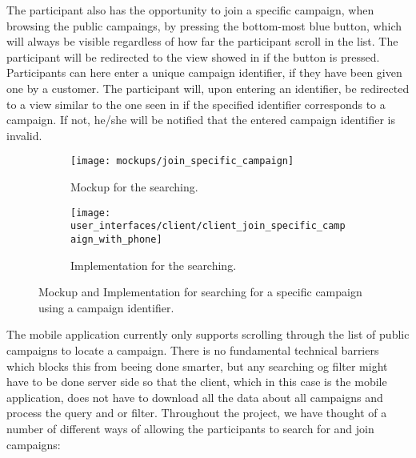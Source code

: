 The participant also has the opportunity to join a specific campaign, when browsing the public campaings, by pressing the bottom-most blue button, which will always be visible regardless of how far the participant scroll in the list. The participant will be redirected to the view showed in  if the button is pressed. Participants can here enter a unique campaign identifier, if they have been given one by a customer. The participant will, upon entering an identifier, be redirected to a view similar to the one seen in  if the specified identifier corresponds to a campaign. If not, he/she will be notified that the entered campaign identifier is invalid. 

\begin{figure}[!htbp]
    \begin{subfigure}[!t]{.48\textwidth}
        \centering
        \texttt{[image: mockups/join\_specific\_campaign]}
        \caption{Mockup for the searching.}
        \label{fig:mockup_specific_campaign}
    \end{subfigure}%
    \begin{subfigure}[!t]{.52\textwidth}
        \centering
        \texttt{[image: user\_interfaces/client/client\_join\_specific\_campaign\_with\_phone]}
        \caption{Implementation for the searching.}
        \label{fig:implementation_specific_campaign}
    \end{subfigure}
    \caption{Mockup and Implementation for searching for a specific campaign using a campaign identifier.}
    \label{fig:specific_campaign}
\end{figure}
\FloatBarrier

The mobile application currently only supports scrolling through the list of public campaigns to locate a campaign. There is no fundamental technical barriers which blocks this from beeing done smarter, but any searching og filter might have to be done server side so that the client, which in this case is the mobile application, does not have to download all the data about all campaigns and process the query and or filter. Throughout the project, we have thought of a number of different ways of allowing the participants to search for and join campaigns:

